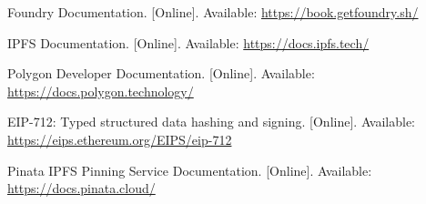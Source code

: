 \documentclass[12pt,a4wide]{report}
\begin{document}
\begin{enumerate}[leftmargin=2.5em, label={[\arabic*]}]
  \item Foundry Documentation. [Online]. Available: \url{https://book.getfoundry.sh/}

  \item IPFS Documentation. [Online]. Available: \url{https://docs.ipfs.tech/}

  \item Polygon Developer Documentation. [Online]. Available:
    \url{https://docs.polygon.technology/}

  \item EIP-712: Typed structured data hashing and signing. [Online]. Available:
    \url{https://eips.ethereum.org/EIPS/eip-712}

  \item Pinata IPFS Pinning Service Documentation. [Online]. Available:
    \url{https://docs.pinata.cloud/}

\end{enumerate}
\end{document}
